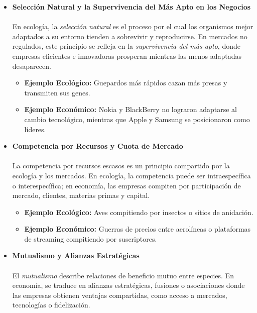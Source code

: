 \documentclass[a4paper,12pt]{article}
\begin{document}
\begin{itemize}
    \item \textbf{Selección Natural y la Supervivencia del Más Apto en los Negocios}
    
    \paragraph{}En ecología, la \textit{selección natural} es el proceso por el cual los organismos mejor adaptados a su entorno tienden a sobrevivir y reproducirse. En mercados no regulados, este principio se refleja en la \textit{supervivencia del más apto}, donde empresas eficientes e innovadoras prosperan mientras las menos adaptadas desaparecen.

    \begin{itemize}
        \item \textbf{Ejemplo Ecológico:} Guepardos más rápidos cazan más presas y transmiten sus genes.
        \item \textbf{Ejemplo Económico:} Nokia y BlackBerry no lograron adaptarse al cambio tecnológico, mientras que Apple y Samsung se posicionaron como líderes.
    \end{itemize}

    \item \textbf{Competencia por Recursos y Cuota de Mercado}
    
    \paragraph{}La competencia por recursos escasos es un principio compartido por la ecología y los mercados. En ecología, la competencia puede ser intraespecífica o interespecífica; en economía, las empresas compiten por participación de mercado, clientes, materias primas y capital.

    \begin{itemize}
        \item \textbf{Ejemplo Ecológico:} Aves compitiendo por insectos o sitios de anidación.
        \item \textbf{Ejemplo Económico:} Guerras de precios entre aerolíneas o plataformas de streaming compitiendo por suscriptores.
    \end{itemize}

    \item \textbf{Mutualismo y Alianzas Estratégicas}

    \paragraph{}El \textit{mutualismo} describe relaciones de beneficio mutuo entre especies. En economía, se traduce en alianzas estratégicas, fusiones o asociaciones donde las empresas obtienen ventajas compartidas, como acceso a mercados, tecnologías o fidelización.


\end{itemize}
\end{document}
